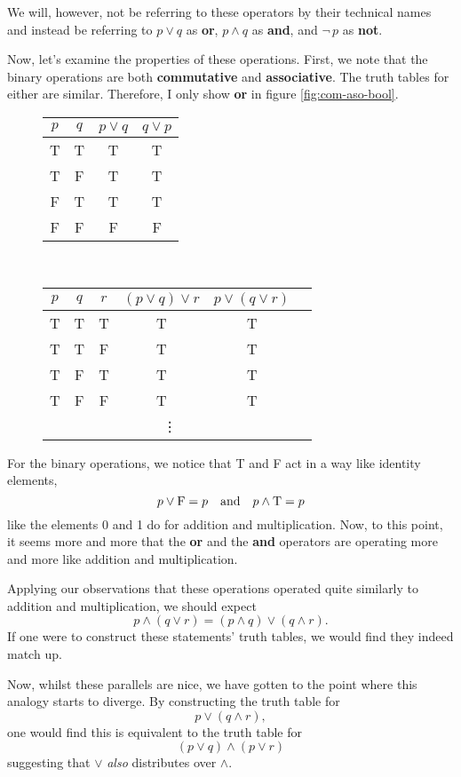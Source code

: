 We will, however, not be referring to these operators by their technical names and instead be referring to $p\vee q$ as \textbf{or}, $p\wedge q$ as \textbf{and}, and $\neg \, p$ as \textbf{not}.

Now, let's examine the properties of these operations.
First, we note that the binary operations are both \textbf{commutative} and \textbf{associative}.
The truth tables for either are similar. Therefore, I only show \textbf{or} in figure \eqref{fig:com-aso-bool}.

\begin{figure}[h]
\centering
	\begin{tabular}{|c|c|c|c|}
		\hline
		$p$ & $q$ & $p \vee q$ & $q \vee p$\\
		\hline
		T & T & T & T\\
		\hline
		T & F & T & T\\
		\hline
		F & T & T & T\\
		\hline
		F & F & F & F\\
		\hline
	\end{tabular}\\ [1em]
	\begin{tabular}{|c|c|c|c|c|c|}
		\hline
		$p$ & $q$ & $r$ & $(p \vee q) \vee r$ & $p \vee (q \vee r)$\\
		\hline
		T & T & T & T & T\\
		\hline
		T & T & F & T & T\\
		\hline
		T & F & T & T & T\\
		\hline
		T & F & F & T & T\\
		\hline
		\multicolumn{5}{|c|}{\vdots}
	\end{tabular}
	\caption{}
	\label{fig:com-aso-bool}
\end{figure}

For the binary operations, we notice that T and F act in a way like identity elements,
$$p \vee \text{F} = p \quad\text{and}\quad  p \wedge \text{T} = p$$
like the elements 0 and 1 do for addition and multiplication.
Now, to this point, it seems more and more that the \textbf{or} and the \textbf{and} operators are operating more and more like addition and multiplication.

Applying our observations that these operations operated quite similarly to addition and multiplication, we should expect 
$$p\wedge (q \vee r) = (p\wedge q ) \vee (q \wedge r).$$
If one were to construct these statements' truth tables, we would find they indeed match up.

Now, whilst these parallels are nice, we have gotten to the point where this analogy starts to diverge.
By constructing the truth table for
$$p\vee (q \wedge r),$$
one would find this is equivalent to the truth table for
$$(p\vee q) \wedge (p\vee r)$$
suggesting that $\vee$ \textit{also} distributes over $\wedge$.

